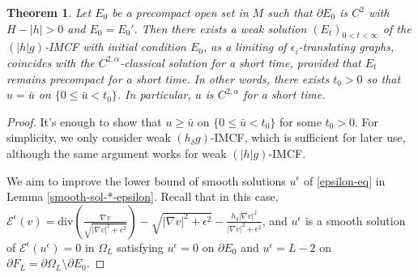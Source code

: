 \documentclass[11pt, letterpaper]{amsart}
\newtheorem{thm}{Theorem}[section]
\theoremstyle{definition}
\theoremstyle{remark}
\begin{document}
\begin{thm}\label{thm-smooth-uniqueness}
	Let $E_0$ be a precompact open set in $M$ such that $\partial E_0$ is $C^2$ with $H- |h|>0$ and $E_0 = E_0'$. Then there exists a weak solution $(E_t)_{0<t<\infty}$ of the $(|h|g)$-IMCF with initial condition $E_0$, as a limiting of $\epsilon _i$-translating graphs, coincides with the $C^{2,\alpha }$-classical solution for a short time, provided that $E_t$ remains precompact for a short time. In other words, there exists $t_0>0$ so that $u = \bar{u}$ on $\{0 \leq \bar{u} < t_0\} $. In particular, $u$ is $C^{2,\alpha }$ for a short time.
\end{thm}
\begin{proof}
	It's enough to show that $u \geq \bar{u}$ on $\{0 \leq \bar{u}< t_0\} $ for some $t_0>0$. For simplicity, we only consider weak $(h_{\delta }g)$-IMCF, which is sufficient for later use, although the same argument works for weak $(|h|g)$-IMCF. 

	We aim to improve the lower bound of smooth solutions $u ^{\epsilon }$ of \ref{epsilon-eq} in Lemma \ref{smooth-sol-*-epsilon}. Recall that in this case, $\mathcal{E}^{\epsilon }(v) = \mathrm{div}\left( \frac{\nabla v}{\sqrt{|\nabla v|^2 + \epsilon ^2} } \right) - \sqrt{|\nabla v|^2+ \epsilon ^2} - \frac{h_\delta |\nabla v|^2}{|\nabla v|^2 + \epsilon ^2}$, and $u ^{\epsilon }$ is a smooth solution of $\mathcal{E}^{\epsilon }(u^{\epsilon })=0$ in $\Omega _{L}$ satisfying $u ^{\epsilon }=0$ on $\partial E_0$ and $u ^{\epsilon } = L- 2$ on $\partial F_L = \partial \Omega _{L} \setminus \partial E_0$. 


\end{proof}
\end{document}
